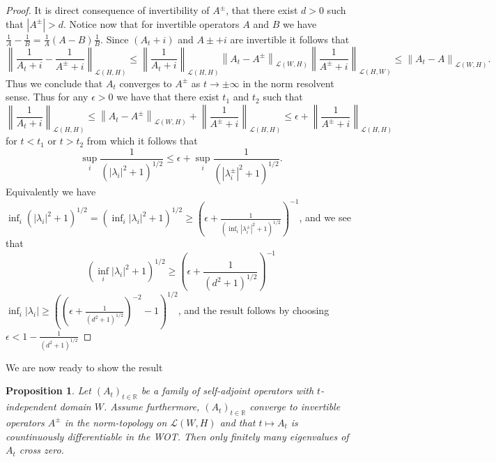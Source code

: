 \documentclass[a4paper,11pt]{article}
\newcommand{\norm}[1]{\left\lVert #1 \right\rVert}
\newcommand{\abs}[1]{\left\lvert #1 \right\rvert}
\newcommand{\R}{\mathbb{R}}
\newtheorem{proposition}{Proposition}
\begin{document}
\begin{proof}
	It is direct consequence of invertibility of $ A^\pm $, that there exist $ d>0 $ such that $ \abs{A^\pm}>d $. Notice now that for invertible operators $ A $ and $ B $ we have $ \frac{1}{A}-\frac{1}{B}=\frac{1}{A}(A-B)\frac{1}{B} $. Since $ (A_t+i) $ and $ A\pm+i $ are invertible it follows that \begin{equation}
	\norm{\frac{1}{A_t+i}-\frac{1}{A^\pm+i}}_{\mathcal{L}(H,H)}\leq\norm{\frac{1}{A_t+i}}_{\mathcal{L}(H,H)}\norm{A_t-A^\pm}_{\mathcal{L}(W,H)}\norm{\frac{1}{A^\pm+i}}_{\mathcal{L}(H,W)}\leq \norm{A_t-A}_{\mathcal{L}(W,H)}.
	\end{equation}
	Thus we conclude that $ A_t $ converges to $ A^\pm $ as $ t\to\pm \infty $ in the norm resolvent sense. Thus for any $ \epsilon>0 $ we have that there exist $ t_1 $ and $ t_2 $ such that  \begin{equation}
	\norm{\frac{1}{A_t+i}}_{\mathcal{L}(H,H)}\leq \norm{A_t-A^\pm}_{\mathcal{L}(W,H)}+\norm{\frac{1}{A^\pm+i}}_{\mathcal{L}(H,H)}\leq \epsilon+\norm{\frac{1}{A^\pm+i}}_{\mathcal{L}(H,H)}
	\end{equation}
	for $ t<t_1 $ or $ t>t_2 $
	from which it follows that \begin{equation}
	\sup_{i}\frac{1}{\left(\abs{\lambda_i}^2+1\right)^{1/2}}\leq \epsilon + \sup_i\frac{1}{\left(\abs{\lambda^\pm_i}^2+1\right)^{1/2}}.
	\end{equation}
	Equivalently we have $ \inf_{i}\left(\abs{\lambda_i}^2+1\right)^{1/2}=\left(\inf_i\abs{\lambda_i}^2+1\right)^{1/2}\geq\left( \epsilon+\frac{1}{\left(\inf_i\abs{\lambda^\pm_i}^2+1\right)^{1/2}}\right)^{-1} $,
	and we see that \begin{equation}
	\left(\inf_i\abs{\lambda_i}^2+1\right)^{1/2}\geq \left( \epsilon+\frac{1}{\left(d^2+1\right)^{1/2}}\right)^{-1}
	\end{equation}
	$ \inf_i\abs{\lambda_i}\geq\left(\left( \epsilon+\frac{1}{\left(d^2+1\right)^{1/2}}\right)^{-2}-1\right)^{1/2}  $, and the result follows by choosing $ \epsilon<1-\frac{1}{\left(d^2+1\right)^{1/2}} $
\end{proof}
We are now ready to show the result
\begin{proposition}
	Let $ (A_t)_{t\in\R} $ be a family of self-adjoint operators with $ t $-independent domain $ W$. Assume furthermore, $ (A_t)_{t\in\R}$ converge to invertible operators $A^\pm $ in the norm-topology on $ \mathcal{L}(W,H) $ and that $ t\mapsto A_t $ is countinuously differentiable in the WOT. Then only finitely many eigenvalues of $ A_t $ cross zero.
\end{proposition}
\end{document}
